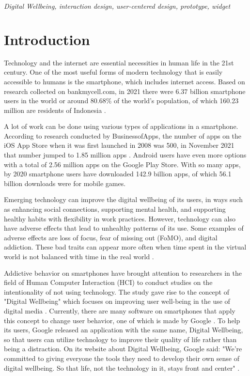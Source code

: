 \documentclass[conference]{IEEEtran}
\begin{document}
\vspace{0.2cm}

\begin{IEEEkeywords}
  \textit{Digital Wellbeing, interaction design, user-centered design, prototype, widget}
\end{IEEEkeywords}

\section{Introduction}

Technology and the internet are essential necessities in human life in the 21st century. One of the most useful forms of modern technology that is easily accessible to humans is the smartphone, which includes internet access. Based on research collected on bankmycell.com, in 2021 there were 6.37 billion smartphone users in the world or around 80.68\% of the world's population, of which 160.23 million are residents of Indonesia \cite{turner2022howmanysmartphones}.

A lot of work can be done using various types of applications in a smartphone. According to research conducted by BusinessofApps, the number of apps on the iOS App Store when it was first launched in 2008 was 500, in November 2021 that number jumped to 1.85 million apps \cite{businessofapps2021}. Android users have even more options with a total of 2.56 million apps on the Google Play Store. With so many apps, by 2020 smartphone users have downloaded 142.9 billion apps, of which 56.1 billion downloads were for mobile games.

Emerging technology can improve the digital wellbeing of its users, in ways such as enhancing social connections, supporting mental health, and supporting healthy habits with flexibility in work practices. However, technology can also have adverse effects that lead to unhealthy patterns of its use. Some examples of adverse effects are loss of focus, fear of missing out (FoMO), and digital addiction. These bad traits can appear more often when time spent in the virtual world is not balanced with time in the real world \cite{ALMOURAD2021101778}.

Addictive behavior on smartphones have brought attention to researchers in the field of Human Computer Interaction (HCI) to conduct studies on the intentionality of not using technology. The study gave rise to the concept of "Digital Wellbeing" which focuses on improving user well-being in the use of digital media \cite{unesco2015dwconference}. Currently, there are many software on smartphones that apply this concept to change user behavior, one of which is made by Google \cite{CHI2019SOCIALIZE}. To help its users, Google released an application with the same name, Digital Wellbeing, so that users can utilize technology to improve their quality of life rather than being a distraction. On its website about Digital Wellbeing, Google said: "We're committed to giving everyone the tools they need to develop their own sense of digital wellbeing. So that life, not the technology in it, stays front and center" \cite{google2019digitalwellbeing}. 
\end{document}
